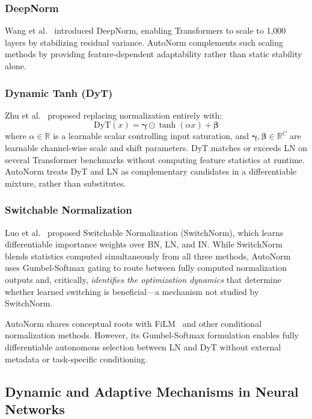 \documentclass[final,3p,times,twocolumn]{elsarticle}
\begin{document}
\subsubsection{DeepNorm}
Wang et al.~\cite{wang2022deepnorm} introduced DeepNorm, enabling
Transformers to scale to 1,000 layers by stabilizing residual
variance. AutoNorm complements such scaling methods by providing
feature-dependent adaptability rather than static stability alone.

\subsubsection{Dynamic Tanh (DyT)}
Zhu et al.~\cite{zhu2025transformers} proposed replacing normalization
entirely with:
\begin{equation}
  \text{DyT}(x) = \boldsymbol{\gamma} \odot \tanh(\alpha x)
                + \boldsymbol{\beta}
  \label{eq:dyt}
\end{equation}
where $\alpha \in \mathbb{R}$ is a learnable scalar controlling input
saturation, and $\boldsymbol{\gamma}, \boldsymbol{\beta} \in
\mathbb{R}^{C}$ are learnable channel-wise scale and shift parameters.
DyT matches or exceeds LN on several Transformer benchmarks without
computing feature statistics at runtime. AutoNorm treats DyT and LN as
complementary candidates in a differentiable mixture, rather than
substitutes.

\subsubsection{Switchable Normalization}
Luo et al.~\cite{luo2019switchable} proposed Switchable Normalization
(SwitchNorm), which learns differentiable importance weights over BN,
LN, and IN. While SwitchNorm blends statistics computed simultaneously
from all three methods, AutoNorm uses Gumbel-Softmax gating to route
between fully computed normalization outputs and, critically,
\textit{identifies the optimization dynamics} that determine whether
learned switching is beneficial---a mechanism not studied by
SwitchNorm.

AutoNorm shares conceptual roots with FiLM~\cite{perez2018film} and
other conditional normalization methods. However, its Gumbel-Softmax
formulation enables fully differentiable autonomous selection between LN
and DyT without external metadata or task-specific conditioning.

\subsection{Dynamic and Adaptive Mechanisms in Neural Networks}
\end{document}
